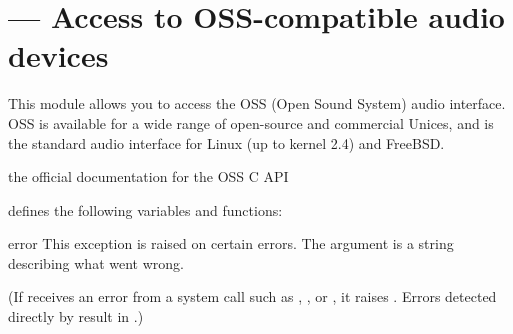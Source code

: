 \section{ ---
         Access to OSS-compatible audio devices}


This module allows you to access the OSS (Open Sound System) audio
interface.  OSS is available for a wide range of open-source and
commercial Unices, and is the standard audio interface for Linux (up to
kernel 2.4) and FreeBSD.

\begin{seealso}
         {the official documentation for the OSS C API}
\end{seealso}

 defines the following variables and functions:

\begin{excdesc}{error}
This exception is raised on certain errors.  The argument is a string
describing what went wrong.

(If  receives an error from a system call such as
, , or , it
raises .  Errors detected directly by
 result in .)
\end{excdesc}

